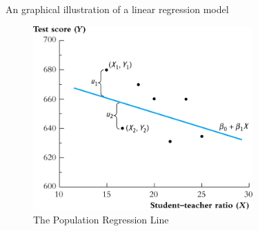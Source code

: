 \documentclass[presentation]{beamer}
\begin{document}
\begin{frame}[label={sec:org57cf958}]{An graphical illustration of a linear regression model}
\begin{figure}[htbp]
\centering
\includegraphics[width=0.75\textwidth]{figure/fig-4-1.png}
\caption{\label{fig:orgf424c3a}
The Population Regression Line}
\end{figure}
\end{frame}
\end{document}
